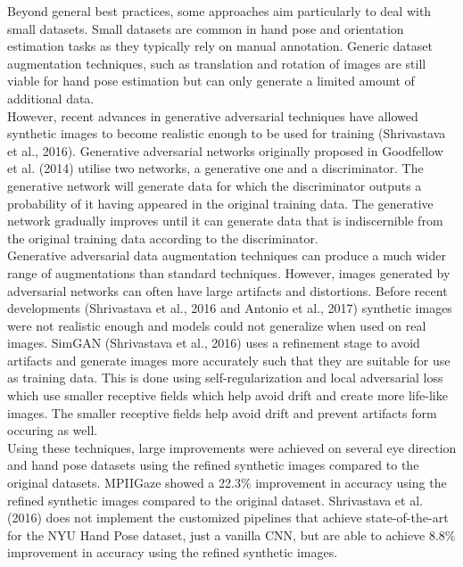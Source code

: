 \documentclass{article}
\begin{document}
Beyond general best practices, some approaches aim particularly to deal with small datasets. Small datasets are common in hand pose and orientation estimation tasks as they typically rely on manual annotation.  Generic dataset augmentation techniques, such as translation and rotation of images are still viable for hand pose estimation but can only generate a limited amount of additional data. \\

However, recent advances in generative adversarial techniques have allowed synthetic images to become realistic enough to be used for training (Shrivastava et al., 2016). Generative adversarial networks originally proposed in Goodfellow et al. (2014) utilise two networks, a generative one and a discriminator. The generative network will generate data for which the discriminator outputs a probability of it having appeared in the original training data. The generative network gradually improves until it can generate data that is indiscernible from the original training data according to the discriminator. \\

Generative adversarial data augmentation techniques can produce a much wider range of augmentations than standard techniques. However, images generated by adversarial networks can often have large artifacts and distortions. Before recent developments (Shrivastava et al., 2016 and Antonio et al., 2017) synthetic images were not realistic enough and models could not generalize when used on real images. SimGAN (Shrivastava et al., 2016) uses a refinement stage to avoid artifacts and generate images more accurately such that they are suitable for use as training data. This is done using self-regularization and local adversarial loss which use smaller receptive fields which help avoid drift and create more life-like images. The smaller receptive fields help avoid drift and prevent artifacts form occuring as well.\\

Using these techniques, large improvements were achieved on several eye direction and hand pose datasets using the refined synthetic images compared to the original datasets. MPIIGaze showed a 22.3\% improvement in accuracy using the refined synthetic images compared to the original dataset. Shrivastava et al. (2016) does not implement the customized pipelines that achieve state-of-the-art for the NYU Hand Pose dataset, just a vanilla CNN, but are able to achieve 8.8\% improvement in accuracy using the refined synthetic images.\\
\end{document}

